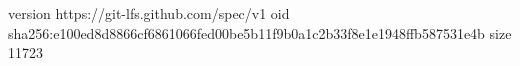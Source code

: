 version https://git-lfs.github.com/spec/v1
oid sha256:e100ed8d8866cf6861066fed00be5b11f9b0a1c2b33f8e1e1948ffb587531e4b
size 11723
